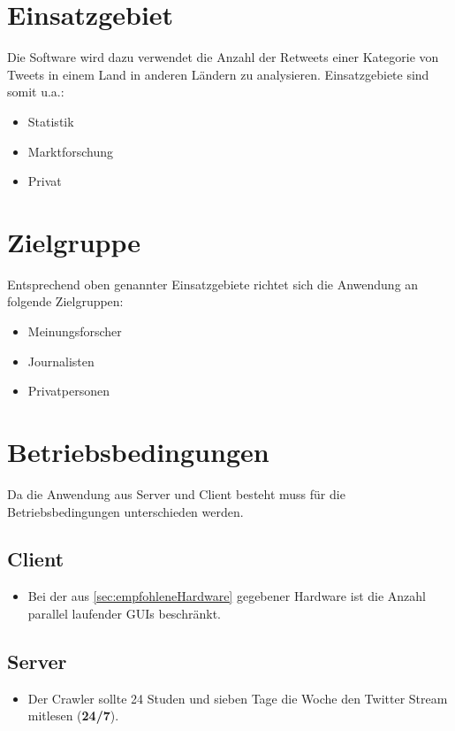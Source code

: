\section{Einsatzgebiet}
Die Software wird dazu verwendet die Anzahl der Retweets einer Kategorie von Tweets in einem Land in anderen Ländern zu analysieren. Einsatzgebiete sind somit u.a.:
\begin{itemize}
	\item Statistik
	\item Marktforschung
	\item Privat
\end{itemize}
\section{Zielgruppe}
Entsprechend oben genannter Einsatzgebiete richtet sich die Anwendung an folgende Zielgruppen:
\begin{itemize}
	\item Meinungsforscher
	\item Journalisten
	\item Privatpersonen
\end{itemize}
\section{Betriebsbedingungen}
Da die Anwendung aus Server und Client besteht muss für die Betriebsbedingungen unterschieden werden.
\subsection*{Client}
\begin{itemize}
	\item Bei der aus \cref{sec:empfohleneHardware} gegebener Hardware ist die Anzahl parallel laufender GUIs beschränkt.
\end{itemize}
\subsection*{Server}
\begin{itemize}
	\item Der Crawler sollte 24 Studen und sieben Tage die Woche den Twitter Stream mitlesen (\textbf{24/7}).
\end{itemize}